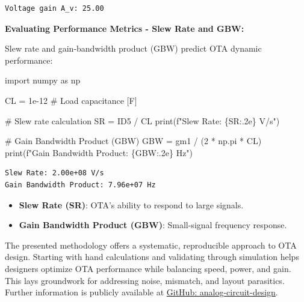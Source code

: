 \documentclass[
  letterpaper,
]{scrbook}
\newenvironment{Shaded}{}{}
\newcommand{\BuiltInTok}[1]{\textcolor[rgb]{0.84,0.23,0.29}{#1}}
\newcommand{\CommentTok}[1]{\textcolor[rgb]{0.42,0.45,0.49}{#1}}
\newcommand{\DecValTok}[1]{\textcolor[rgb]{0.00,0.36,0.77}{#1}}
\newcommand{\FloatTok}[1]{\textcolor[rgb]{0.00,0.36,0.77}{#1}}
\newcommand{\ImportTok}[1]{\textcolor[rgb]{0.01,0.18,0.38}{#1}}
\newcommand{\NormalTok}[1]{\textcolor[rgb]{0.14,0.16,0.18}{#1}}
\newcommand{\OperatorTok}[1]{\textcolor[rgb]{0.14,0.16,0.18}{#1}}
\newcommand{\SpecialCharTok}[1]{\textcolor[rgb]{0.00,0.36,0.77}{#1}}
\newcommand{\SpecialStringTok}[1]{\textcolor[rgb]{0.01,0.18,0.38}{#1}}
\providecommand{\tightlist}{%
  \setlength{\itemsep}{0pt}\setlength{\parskip}{0pt}}
\begin{document}
\begin{verbatim}
Voltage gain A_v: 25.00
\end{verbatim}

\textbf{Evaluating Performance Metrics - Slew Rate and GBW:}

Slew rate and gain-bandwidth product (GBW) predict OTA dynamic
performance:

\begin{Shaded}
\begin{Highlighting}[]
\ImportTok{import}\NormalTok{ numpy }\ImportTok{as}\NormalTok{ np}

\NormalTok{CL }\OperatorTok{=} \FloatTok{1e{-}12}   \CommentTok{\# Load capacitance [F]}

\CommentTok{\# Slew rate calculation}
\NormalTok{SR }\OperatorTok{=}\NormalTok{ ID5 }\OperatorTok{/}\NormalTok{ CL}
\BuiltInTok{print}\NormalTok{(}\SpecialStringTok{f"Slew Rate: }\SpecialCharTok{\{}\NormalTok{SR}\SpecialCharTok{:.2e\}}\SpecialStringTok{ V/s"}\NormalTok{)}

\CommentTok{\# Gain Bandwidth Product (GBW)}
\NormalTok{GBW }\OperatorTok{=}\NormalTok{ gm1 }\OperatorTok{/}\NormalTok{ (}\DecValTok{2} \OperatorTok{*}\NormalTok{ np.pi }\OperatorTok{*}\NormalTok{ CL)}
\BuiltInTok{print}\NormalTok{(}\SpecialStringTok{f"Gain Bandwidth Product: }\SpecialCharTok{\{}\NormalTok{GBW}\SpecialCharTok{:.2e\}}\SpecialStringTok{ Hz"}\NormalTok{)}
\end{Highlighting}
\end{Shaded}

\begin{verbatim}
Slew Rate: 2.00e+08 V/s
Gain Bandwidth Product: 7.96e+07 Hz
\end{verbatim}

\begin{itemize}
\tightlist
\item
  \textbf{Slew Rate (SR)}: OTA's ability to respond to large signals.
\item
  \textbf{Gain Bandwidth Product (GBW)}: Small-signal frequency
  response.
\end{itemize}

The presented methodology offers a systematic, reproducible approach to
OTA design. Starting with hand calculations and validating through
simulation helps designers optimize OTA performance while balancing
speed, power, and gain. This lays groundwork for addressing noise,
mismatch, and layout parasitics. Further information is publicly
available at
\href{https://github.com/iic-jku/analog-circuit-design/blob/main/sizing/sizing_basic_ota.ipynb}{GitHub:
analog-circuit-design}.
\end{document}
